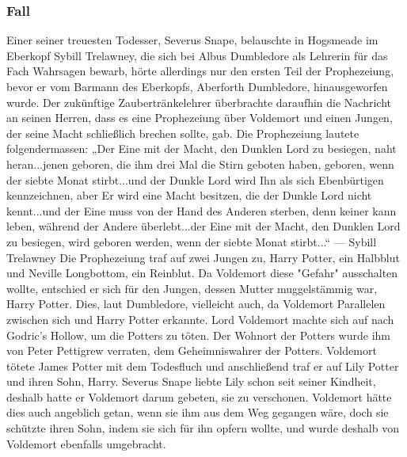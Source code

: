 \documentclass[a4paper, 10pt]{article}
\begin{document}
\subsubsection*{\large Fall}
Einer seiner treuesten Todesser, Severus Snape, belauschte in Hogsmeade im Eberkopf Sybill Trelawney, die sich bei Albus Dumbledore als Lehrerin für das Fach Wahrsagen bewarb, hörte allerdings nur den ersten Teil der Prophezeiung, bevor er vom Barmann des Eberkopfs, Aberforth Dumbledore, hinausgeworfen wurde. Der zukünftige Zaubertränkelehrer überbrachte daraufhin die Nachricht an seinen Herren, dass es eine Prophezeiung über Voldemort und einen Jungen, der seine Macht schließlich brechen sollte, gab.
\vspace{10pt}
\newline
{}  
Die Prophezeiung lautete folgendermassen:
\vspace{10pt}
\newline
{}  
„Der Eine mit der Macht, den Dunklen Lord zu besiegen, naht heran...jenen geboren, die ihm drei Mal die Stirn geboten haben, geboren, wenn der siebte Monat stirbt...und der Dunkle Lord wird Ihn als sich Ebenbürtigen kennzeichnen, aber Er wird eine Macht besitzen, die der Dunkle Lord nicht kennt...und der Eine muss von der Hand des Anderen sterben, denn keiner kann leben, während der Andere überlebt...der Eine mit der Macht, den Dunklen Lord zu besiegen, wird geboren werden, wenn der siebte Monat stirbt...“
\vspace{10pt}
\newline
{}  
— Sybill Trelawney
\vspace{10pt}
\newline
{}  
Die Prophezeiung traf auf zwei Jungen zu, Harry Potter, ein Halbblut und Neville Longbottom, ein Reinblut. Da Voldemort diese "Gefahr" ausschalten wollte, entschied er sich für den Jungen, dessen Mutter muggelstämmig war, Harry Potter. Dies, laut Dumbledore, vielleicht auch, da Voldemort Parallelen zwischen sich und Harry Potter erkannte.
\vspace{10pt}
\newline
{}  
Lord Voldemort machte sich auf nach Godric's Hollow, um die Potters zu töten. Der Wohnort der Potters wurde ihm von Peter Pettigrew verraten, dem Geheimniswahrer der Potters. Voldemort tötete James Potter mit dem Todesfluch und anschließend traf er auf Lily Potter und ihren Sohn, Harry. Severus Snape liebte Lily schon seit seiner Kindheit, deshalb hatte er Voldemort darum gebeten, sie zu verschonen. Voldemort hätte dies auch angeblich getan, wenn sie ihm aus dem Weg gegangen wäre, doch sie schützte ihren Sohn, indem sie sich für ihn opfern wollte, und wurde deshalb von Voldemort ebenfalls umgebracht.
\end{document}
